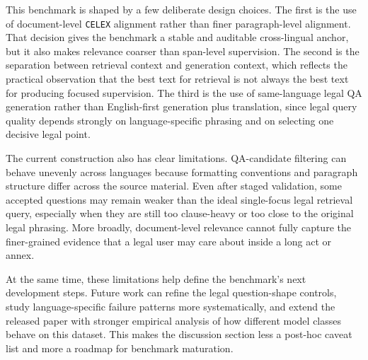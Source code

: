 This benchmark is shaped by a few deliberate design choices. The first is the use of document-level \texttt{CELEX} alignment rather than finer paragraph-level alignment. That decision gives the benchmark a stable and auditable cross-lingual anchor, but it also makes relevance coarser than span-level supervision. The second is the separation between retrieval context and generation context, which reflects the practical observation that the best text for retrieval is not always the best text for producing focused supervision. The third is the use of same-language legal QA generation rather than English-first generation plus translation, since legal query quality depends strongly on language-specific phrasing and on selecting one decisive legal point.

The current construction also has clear limitations. QA-candidate filtering can behave unevenly across languages because formatting conventions and paragraph structure differ across the source material. Even after staged validation, some accepted questions may remain weaker than the ideal single-focus legal retrieval query, especially when they are still too clause-heavy or too close to the original legal phrasing. More broadly, document-level relevance cannot fully capture the finer-grained evidence that a legal user may care about inside a long act or annex.

At the same time, these limitations help define the benchmark's next development steps. Future work can refine the legal question-shape controls, study language-specific failure patterns more systematically, and extend the released paper with stronger empirical analysis of how different model classes behave on this dataset. This makes the discussion section less a post-hoc caveat list and more a roadmap for benchmark maturation.

